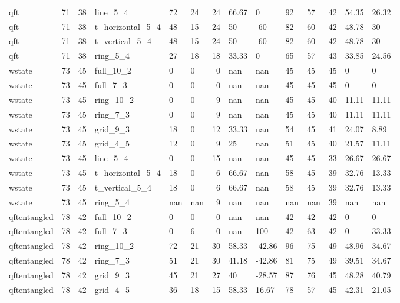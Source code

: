 \begin{longtable}{lrrlllrllllrll}
qft & 71 & 38 & line\_5\_4 & 72 & 24 & 24 & 66.67 & 0 & 92 & 57 & 42 & 54.35 & 26.32 \\
qft & 71 & 38 & t\_horizontal\_5\_4 & 48 & 15 & 24 & 50 & -60 & 82 & 60 & 42 & 48.78 & 30 \\
qft & 71 & 38 & t\_vertical\_5\_4 & 48 & 15 & 24 & 50 & -60 & 82 & 60 & 42 & 48.78 & 30 \\
qft & 71 & 38 & ring\_5\_4 & 27 & 18 & 18 & 33.33 & 0 & 65 & 57 & 43 & 33.85 & 24.56 \\
wstate & 73 & 45 & full\_10\_2 & 0 & 0 & 0 & nan & nan & 45 & 45 & 45 & 0 & 0 \\
wstate & 73 & 45 & full\_7\_3 & 0 & 0 & 0 & nan & nan & 45 & 45 & 45 & 0 & 0 \\
wstate & 73 & 45 & ring\_10\_2 & 0 & 0 & 9 & nan & nan & 45 & 45 & 40 & 11.11 & 11.11 \\
wstate & 73 & 45 & ring\_7\_3 & 0 & 0 & 9 & nan & nan & 45 & 45 & 40 & 11.11 & 11.11 \\
wstate & 73 & 45 & grid\_9\_3 & 18 & 0 & 12 & 33.33 & nan & 54 & 45 & 41 & 24.07 & 8.89 \\
wstate & 73 & 45 & grid\_4\_5 & 12 & 0 & 9 & 25 & nan & 51 & 45 & 40 & 21.57 & 11.11 \\
wstate & 73 & 45 & line\_5\_4 & 0 & 0 & 15 & nan & nan & 45 & 45 & 33 & 26.67 & 26.67 \\
wstate & 73 & 45 & t\_horizontal\_5\_4 & 18 & 0 & 6 & 66.67 & nan & 58 & 45 & 39 & 32.76 & 13.33 \\
wstate & 73 & 45 & t\_vertical\_5\_4 & 18 & 0 & 6 & 66.67 & nan & 58 & 45 & 39 & 32.76 & 13.33 \\
wstate & 73 & 45 & ring\_5\_4 & nan & nan & 9 & nan & nan & nan & nan & 39 & nan & nan \\
qftentangled & 78 & 42 & full\_10\_2 & 0 & 0 & 0 & nan & nan & 42 & 42 & 42 & 0 & 0 \\
qftentangled & 78 & 42 & full\_7\_3 & 0 & 6 & 0 & nan & 100 & 42 & 63 & 42 & 0 & 33.33 \\
qftentangled & 78 & 42 & ring\_10\_2 & 72 & 21 & 30 & 58.33 & -42.86 & 96 & 75 & 49 & 48.96 & 34.67 \\
qftentangled & 78 & 42 & ring\_7\_3 & 51 & 21 & 30 & 41.18 & -42.86 & 81 & 75 & 49 & 39.51 & 34.67 \\
qftentangled & 78 & 42 & grid\_9\_3 & 45 & 21 & 27 & 40 & -28.57 & 87 & 76 & 45 & 48.28 & 40.79 \\
qftentangled & 78 & 42 & grid\_4\_5 & 36 & 18 & 15 & 58.33 & 16.67 & 78 & 57 & 45 & 42.31 & 21.05 \\

\end{longtable}
